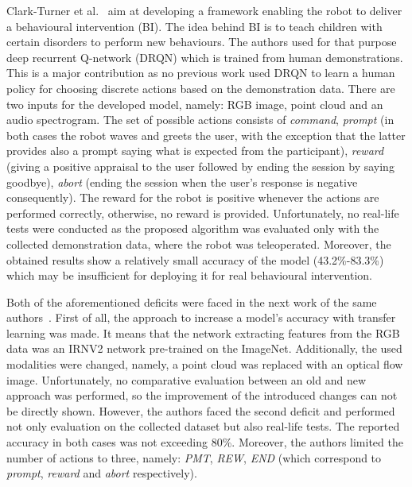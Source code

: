 \documentclass[thesis]{mas_proposal}
\begin{document}
Clark-Turner et al.~\cite{ClarkTurner2017} aim at developing a framework enabling the robot to deliver a behavioural intervention (BI). The idea behind BI is to teach children with certain disorders to perform new behaviours. The authors used for that purpose deep recurrent Q-network (DRQN) which is trained from human demonstrations. This is a major contribution as no previous work used DRQN to learn a human policy for choosing discrete actions based on the demonstration data. There are two inputs for the developed model, namely: RGB image, point cloud and an audio spectrogram. The set of possible actions consists of \emph{command}, \emph{prompt} (in both cases the robot waves and greets the user, with the exception that the latter provides also a prompt saying what is expected from the participant), \emph{reward} (giving a positive appraisal to the user followed by ending the session by saying goodbye), \emph{abort} (ending the session when the user's response is negative consequently). The reward for the robot is positive whenever the actions are performed correctly, otherwise, no reward is provided. Unfortunately, no real-life tests were conducted as the proposed algorithm was evaluated only with the collected demonstration data, where the robot was teleoperated. Moreover, the obtained results show a relatively small accuracy of the model (43.2\%-83.3\%) which may be insufficient for deploying it for real behavioural intervention.

Both of the aforementioned deficits were faced in the next work of the same authors~\cite{Turner2018}. First of all, the approach to increase a model's accuracy with transfer learning was made. It means that the network extracting features from the RGB data was an IRNV2 network pre-trained on the ImageNet. Additionally, the used modalities were changed, namely, a point cloud was replaced with an optical flow image. Unfortunately, no comparative evaluation between an old and new approach was performed, so the improvement of the introduced changes can not be directly shown. However, the authors faced the second deficit and performed not only evaluation on the collected dataset but also real-life tests. The reported accuracy in both cases was not exceeding 80\%. Moreover, the authors limited the number of actions to three, namely: \emph{PMT}, \emph{REW}, \emph{END} (which correspond to \emph{prompt}, \emph{reward} and \emph{abort} respectively).
\end{document}
